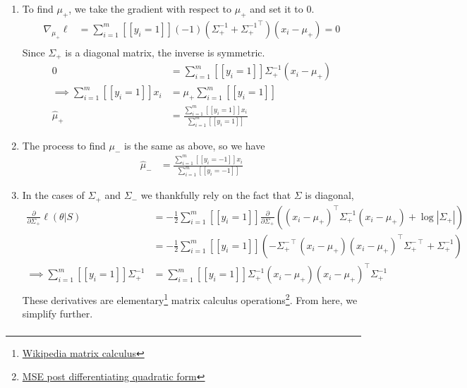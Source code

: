 \documentclass{amsart}
\theoremstyle{definition}
\begin{document}
\begin{enumerate}[(a)]
\begin{enumerate}
            \item To find $\mu_+$, we take the gradient with respect to $\mu_+$ and set it to 0.
            \begin{align*}
				\nabla_{\mu_+}	\ell &= \sum_{i=1}^{m}[[y_i = 1]] (-1)(\Sigma_+^{-1} + {\Sigma_+^{-1}}^\intercal)(x_i - \mu_+) = 0\\
            \end{align*}
			Since $\Sigma_+$ is a diagonal matrix, the inverse is symmetric.
			\begin{align*}
				0 &= \sum_{i=1}^{m}[[y_i = 1]] \Sigma_+^{-1}(x_i - \mu_+) \\
				\implies \sum_{i=1}^{m}[[y_i = 1]] x_i &= \mu_+ \sum_{i=1}^{m}[[y_i = 1]] \\
				\hat{\mu}_+ &= \frac{\sum_{i=1}^{m}[[y_i = 1]] x_i}{\sum_{i=1}^{m}[[y_i = 1]]}
			\end{align*}
			\item The process to find $\mu_-$ is the same as above, so we have
			\begin{align*}
				\hat{\mu}_- &= \frac{\sum_{i=1}^{m}[[y_i = -1]] x_i}{\sum_{i=1}^{m}[[y_i = -1]]}
			\end{align*}
            \item In the cases of $\Sigma_+$ and $\Sigma_-$ we thankfully rely on the fact that $\Sigma$ is diagonal,
            \begin{align*}
                \frac{\partial}{\partial \Sigma_+} \ell(\theta|S) &= -\frac12\sum_{i=1}^{m} [[y_i = 1]]\frac{\partial }{\partial \Sigma_+}\left( (x_i - \mu_+)^\intercal \Sigma_+^{-1}(x_i - \mu_+) + \log|\Sigma_+|\right)\\
				&= -\frac12\sum_{i=1}^{m} [[y_i = 1]]\left( -{\Sigma_+^{-\intercal}}(x_i - \mu_+) (x_i-\mu_+)^\intercal\Sigma_+^{-\intercal} + \Sigma_+^{-1}\right)\\
				\implies \sum_{i=1}^{m} [[y_i = 1]]\Sigma_+^{-1} &= \sum_{i=1}^{m} [[y_i = 1]]\Sigma_+^{-1}(x_i - \mu_+) (x_i-\mu_+)^\intercal\Sigma_+^{-1}\\
            \end{align*}
			These derivatives are elementary\footnote{\href{URLhttps://en.wikipedia.org/wiki/Matrix_calculus\#Scalar-by-matrix_identities}{Wikipedia matrix calculus}} matrix calculus operations\footnote{\href{URLhttps://math.stackexchange.com/a/5023154/1060123}{MSE post differentiating quadratic form}}. From here, we simplify further. %
			\begin{align*}

\end{align*}
\end{enumerate}
\end{enumerate}
\end{document}
